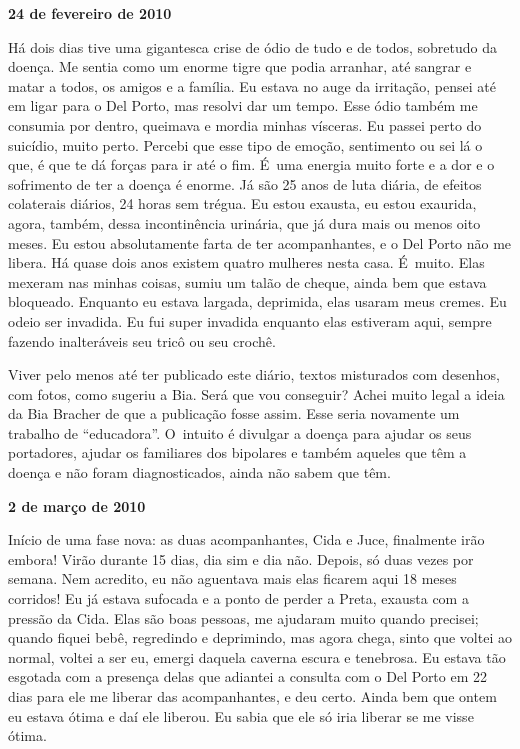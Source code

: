 \begin{center}\textbf{\asterisc{}}\end{center}


\begin{flushright}\textbf{24 de fevereiro de 2010}\end{flushright}


Há dois dias tive uma gigantesca crise de ódio de tudo e de todos,
sobretudo da doença. Me sentia como um enorme tigre que podia arranhar,
até sangrar e matar a todos, os amigos e a família. Eu estava no auge da
irritação, pensei até em ligar para o Del Porto, mas resolvi dar um
tempo. Esse ódio também me consumia por dentro, queimava e mordia minhas
vísceras. Eu passei perto do suicídio, muito perto. Percebi que esse
tipo de emoção, sentimento ou sei lá o que, é que te dá forças para ir
até o fim. É~uma energia muito forte e a dor e o sofrimento de ter a
doença é enorme. Já são 25 anos de luta diária, de efeitos colaterais
diários, 24 horas sem trégua. Eu estou exausta, eu estou exaurida,
agora, também, dessa incontinência urinária, que já dura mais ou menos
oito meses. Eu estou absolutamente farta de ter acompanhantes, e o Del
Porto não me libera. Há quase dois anos existem quatro mulheres nesta
casa. É~muito. Elas mexeram nas minhas coisas, sumiu um talão de cheque,
ainda bem que estava bloqueado. Enquanto eu estava largada, deprimida,
elas usaram meus cremes. Eu odeio ser invadida. Eu fui super
invadida enquanto elas estiveram aqui, sempre fazendo inalteráveis seu
tricô ou seu crochê.

Viver pelo menos até ter publicado este diário, textos misturados com
desenhos, com fotos, como sugeriu a Bia. Será que vou conseguir? Achei
muito legal a ideia da Bia Bracher de que a publicação fosse assim. Esse
seria novamente um trabalho de ``educadora''. O~intuito é divulgar a
doença para ajudar os seus portadores, ajudar os familiares dos
bipolares e também aqueles que têm a doença e não foram diagnosticados,
ainda não sabem que têm.

\begin{center}\textbf{\asterisc{}}\end{center}


\textbf{}

\begin{flushright}\textbf{2 de março de 2010}\end{flushright}


Início de uma fase nova: as duas acompanhantes, Cida e Juce, finalmente
irão embora! Virão durante 15 dias, dia sim e dia não. Depois, só duas
vezes por semana. Nem acredito, eu não aguentava mais elas ficarem aqui
18 meses corridos! Eu já estava sufocada e a ponto de perder a Preta,
exausta com a pressão da Cida. Elas são boas pessoas, me ajudaram muito
quando precisei; quando fiquei bebê, regredindo e deprimindo, mas agora
chega, sinto que voltei ao normal, voltei a ser eu, emergi daquela
caverna escura e tenebrosa. Eu estava tão esgotada com a presença delas
que adiantei a consulta com o Del Porto em 22 dias para ele me liberar
das acompanhantes, e deu certo. Ainda bem que ontem eu estava ótima e
daí ele liberou. Eu sabia que ele só iria liberar se me visse ótima.

